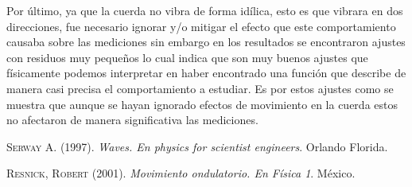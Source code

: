 \documentclass[10pt,a4paper]{article}
\begin{document}
Por último, ya que la cuerda no vibra de forma idílica, esto es que vibrara en dos direcciones, fue necesario ignorar y/o mitigar el efecto que este comportamiento causaba sobre las mediciones sin embargo en los resultados se encontraron ajustes con residuos muy pequeños lo cual indica que son muy buenos ajustes que físicamente podemos interpretar en haber encontrado una función que describe de manera casi precisa el comportamiento a estudiar. Es por estos ajustes como se muestra que aunque se hayan ignorado efectos de movimiento en la cuerda estos no afectaron de manera significativa las mediciones.

\begin{thebibliography}{x}

 \textsc{Serway A. }(1997). \textit {Waves. En physics for scientist engineers}. Orlando Florida.

 \textsc{Resnick, Robert }(2001). 
\textit{Movimiento ondulatorio. En Física 1}. México.
\end{thebibliography}
\end{document}
